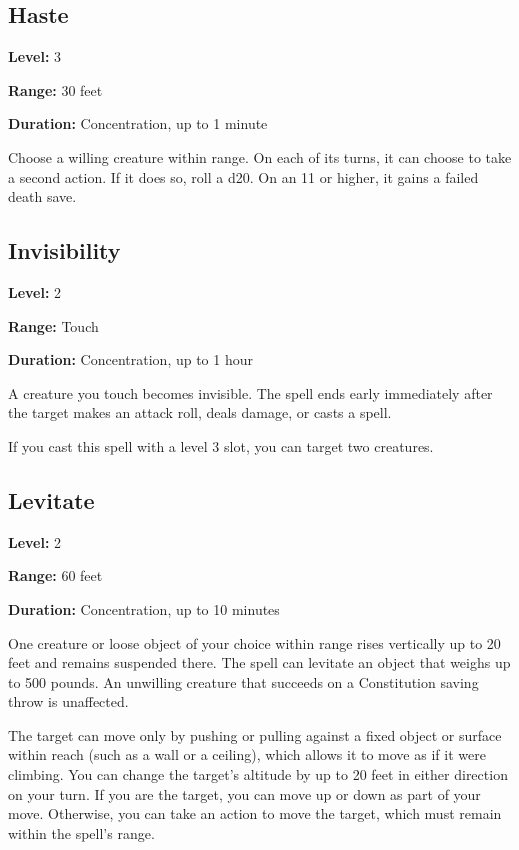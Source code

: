 \documentclass[12pt,letterpaper,twocolumn,openany,nodeprecatedcode,bg=none]{dndbook}
\let\oldsubsection\subsection
\renewcommand{\subsection}[1]{%
  \needspace{5\baselineskip}%
  \oldsubsection{#1}%
}
\begin{document}
\subsection{Haste}\label{haste}

\textbf{Level:} 3

\textbf{Range:} 30 feet

\textbf{Duration:} Concentration, up to 1 minute

Choose a willing creature within range. On each of its turns, it can
choose to take a second action. If it does so, roll a d20. On an 11 or
higher, it gains a failed death save.

\subsection{Invisibility}\label{invisibility}

\textbf{Level:} 2

\textbf{Range:} Touch

\textbf{Duration:} Concentration, up to 1 hour

A creature you touch becomes invisible. The spell ends early immediately
after the target makes an attack roll, deals damage, or casts a spell.

If you cast this spell with a level 3 slot, you can target two
creatures.

\subsection{Levitate}\label{levitate}

\textbf{Level:} 2

\textbf{Range:} 60 feet

\textbf{Duration:} Concentration, up to 10 minutes

One creature or loose object of your choice within range rises
vertically up to 20 feet and remains suspended there. The spell can
levitate an object that weighs up to 500 pounds. An unwilling creature
that succeeds on a Constitution saving throw is unaffected.

The target can move only by pushing or pulling against a fixed object or
surface within reach (such as a wall or a ceiling), which allows it to
move as if it were climbing. You can change the target's altitude by up
to 20 feet in either direction on your turn. If you are the target, you
can move up or down as part of your move. Otherwise, you can take an
action to move the target, which must remain within the spell's range.
\end{document}
